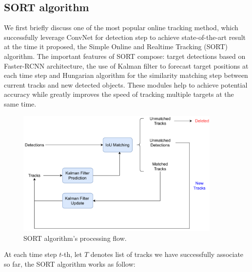 \subsection{SORT algorithm}
\label{sec:sort}
We first briefly discuss one of the most popular online tracking method, which successfully leverage ConvNet for detection step to achieve state-of-the-art result at the time it proposed, the Simple Online and Realtime Tracking (SORT) \cite{bewley2016simple} algorithm.
The important features of SORT compose: target detections based on Faster-RCNN \cite{NIPS2015_14bfa6bb} architecture, the use of Kalman filter \cite{kalman1960new} to forecast target positions at each time step and Hungarian algorithm \cite{kuhn1955hungarian} for the similarity matching step between current tracks and new detected objects. These modules help to achieve potential accuracy while greatly improves the speed of tracking multiple targets at the same time. \\
\begin{figure}[t!]
    \centering
    \includegraphics[width=0.9\textwidth]{resources/images/SORT.pdf}
    \caption{SORT algorithm's processing flow.}
    \label{fig:SORT_overview}
\end{figure}
At each time step $t$-th, let $T$ denotes list of tracks we have successfully associate so far, the SORT algorithm works as follow:
